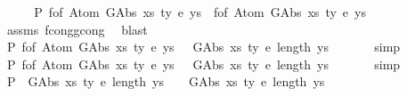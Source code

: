 \begin{isabellebody}
%
\isadelimproof
%
\endisadelimproof
%
\isatagproof
{}\isamarkupfalse%
\ {\isacharminus}{\kern0pt}\isanewline
\ \ \isamarkupfalse%
\ P{}{\isacharcolon}{\kern0pt}\ {\isachardoublequoteopen}f{\isacharunderscore}{\kern0pt}of\ {\isacharparenleft}{\kern0pt}Atom\ {\isacharparenleft}{\kern0pt}GAbs\ xs{}\ ty{}\ e{}{\isacharparenright}{\kern0pt}\ ys{}{\isacharparenright}{\kern0pt}\ {\isacharequal}{\kern0pt}\ f{\isacharunderscore}{\kern0pt}of\ {\isacharparenleft}{\kern0pt}Atom\ {\isacharparenleft}{\kern0pt}GAbs\ xs{}\ ty{}\ e{}{\isacharparenright}{\kern0pt}\ ys{}{\isacharparenright}{\kern0pt}{\isachardoublequoteclose}\isanewline
\ \ \ \ \isamarkupfalse%
\ assms\ f{\isacharunderscore}{\kern0pt}cong{\isacharunderscore}{\kern0pt}gcong\ \isamarkupfalse%
\ blast\isanewline
\ \ \isamarkupfalse%
\ P{}{\isacharcolon}{\kern0pt}\ {\isachardoublequoteopen}f{\isacharunderscore}{\kern0pt}of\ {\isacharparenleft}{\kern0pt}Atom\ {\isacharparenleft}{\kern0pt}GAbs\ xs{}\ ty{}\ e{}{\isacharparenright}{\kern0pt}\ ys{}{\isacharparenright}{\kern0pt}\ {\isacharequal}{\kern0pt}\ {\isacharbraceleft}{\kern0pt}{\isacharhash}{\kern0pt}\ {\isacharparenleft}{\kern0pt}GAbs\ xs{}\ ty{}\ e{}{\isacharcomma}{\kern0pt}\ length\ ys{}{\isacharparenright}{\kern0pt}\ {\isacharhash}{\kern0pt}{\isacharbraceright}{\kern0pt}{\isachardoublequoteclose}\isanewline
\ \ \ \ \isamarkupfalse%
\ simp\isanewline
\ \ \isamarkupfalse%
\ P{}{\isacharcolon}{\kern0pt}\ {\isachardoublequoteopen}f{\isacharunderscore}{\kern0pt}of\ {\isacharparenleft}{\kern0pt}Atom\ {\isacharparenleft}{\kern0pt}GAbs\ xs{}\ ty{}\ e{}{\isacharparenright}{\kern0pt}\ ys{}{\isacharparenright}{\kern0pt}\ {\isacharequal}{\kern0pt}\ {\isacharbraceleft}{\kern0pt}{\isacharhash}{\kern0pt}\ {\isacharparenleft}{\kern0pt}GAbs\ xs{}\ ty{}\ e{}{\isacharcomma}{\kern0pt}\ length\ ys{}{\isacharparenright}{\kern0pt}\ {\isacharhash}{\kern0pt}{\isacharbraceright}{\kern0pt}{\isachardoublequoteclose}\isanewline
\ \ \ \ \isamarkupfalse%
\ simp\isanewline
\ \ \isamarkupfalse%
\ P{}{\isacharcolon}{\kern0pt}\ {\isachardoublequoteopen}{\isacharbraceleft}{\kern0pt}{\isacharhash}{\kern0pt}\ {\isacharparenleft}{\kern0pt}GAbs\ xs{}\ ty{}\ e{}{\isacharcomma}{\kern0pt}\ length\ ys{}{\isacharparenright}{\kern0pt}\ {\isacharhash}{\kern0pt}{\isacharbraceright}{\kern0pt}\ {\isacharequal}{\kern0pt}\ {\isacharbraceleft}{\kern0pt}{\isacharhash}{\kern0pt}\ {\isacharparenleft}{\kern0pt}GAbs\ xs{}\ ty{}\ e{}{\isacharcomma}{\kern0pt}\ length\ ys{}{\isacharparenright}{\kern0pt}\ {\isacharhash}{\kern0pt}{\isacharbraceright}{\kern0pt}{\isachardoublequoteclose}\isanewline

\end{isabellebody}
